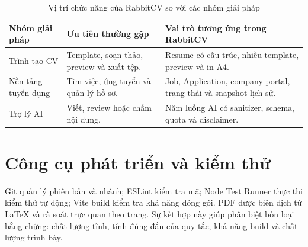 \begin{table}[H]
    \centering
    \small
    \begin{tabularx}{\textwidth}{|p{}|Y|Y|} \hline
        \textbf{Nhóm giải pháp} & \textbf{Ưu tiên thường gặp} & \textbf{Vai trò tương ứng trong RabbitCV} \\ \hline
        Trình tạo CV & Template, soạn thảo, preview và xuất tệp. & Resume có cấu trúc, nhiều template, preview và in A4. \\ \hline
        Nền tảng tuyển dụng & Tìm việc, ứng tuyển và quản lý hồ sơ. & Job, Application, company portal, trạng thái và snapshot lịch sử. \\ \hline
        Trợ lý AI & Viết, review hoặc chấm nội dung. & Năm luồng AI có sanitizer, schema, quota và disclaimer. \\ \hline
    \end{tabularx}
    \caption{Vị trí chức năng của RabbitCV so với các nhóm giải pháp}
    \label{tab:solution-groups}
\end{table}

\section{Công cụ phát triển và kiểm thử}

Git quản lý phiên bản và nhánh; ESLint kiểm tra mã; Node Test Runner thực thi kiểm thử tự động; Vite build kiểm tra khả năng đóng gói. PDF được biên dịch từ LaTeX và rà soát trực quan theo trang. Sự kết hợp này giúp phân biệt bốn loại bằng chứng: chất lượng tĩnh, tính đúng đắn của quy tắc, khả năng build và chất lượng trình bày.
